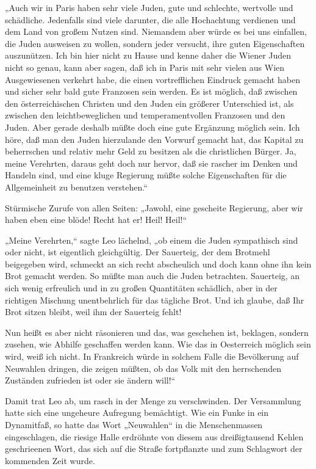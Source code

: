 „Auch wir in Paris haben sehr viele Juden, gute und schlechte,
wertvolle und schädliche. Jedenfalls sind viele darunter, die alle
Hochachtung verdienen und dem Land von großem Nutzen sind.
Niemandem aber würde es bei uns einfallen, die Juden ausweisen zu
wollen, sondern jeder versucht, ihre guten Eigenschaften
auszunützen. Ich bin hier nicht zu Hause und kenne daher die Wiener
Juden nicht so genau, kann aber sagen, daß ich in Paris mit sehr
vielen aus Wien Ausgewiesenen verkehrt habe, die einen
vortrefflichen Eindruck gemacht haben und sicher sehr bald gute
Franzosen sein werden. Es ist möglich, daß zwischen den
österreichischen Christen und den Juden ein größerer Unterschied
ist, als zwischen den leichtbeweglichen und temperamentvollen
Franzosen und den Juden. Aber gerade deshalb müßte doch eine gute
Ergänzung möglich sein.  Ich höre, daß man den
Juden hierzulande den Vorwurf gemacht hat, das Kapital zu
beherrschen und relativ mehr Geld zu besitzen als die christlichen
Bürger. Ja, meine Verehrten, daraus geht doch nur hervor, daß sie
rascher im Denken und Handeln sind, und eine kluge Regierung müßte
solche Eigenschaften für die Allgemeinheit zu benutzen verstehen.“

Stürmische Zurufe von allen Seiten: „Jawohl, eine gescheite
Regierung, aber wir haben eben eine blöde! Recht hat er! Heil!
Heil!“

„Meine Verehrten,“ sagte Leo lächelnd, „ob einem die Juden
sympathisch sind oder nicht, ist eigentlich gleichgültig. Der
Sauerteig, der dem Brotmehl beigegeben wird, schmeckt an sich recht
abscheulich und doch kann ohne ihn kein Brot gemacht werden. So
müßte man auch die Juden betrachten. Sauerteig, an sich wenig
erfreulich und in zu großen Quantitäten schädlich, aber in der
richtigen Mischung unentbehrlich für das tägliche Brot. Und ich
glaube, daß Ihr Brot sitzen bleibt, weil ihm der Sauerteig fehlt!

Nun heißt es aber nicht räsonieren und das, was geschehen ist,
beklagen, sondern zusehen, wie Abhilfe geschaffen werden kann. Wie
das in Oesterreich möglich sein wird, weiß ich nicht. In Frankreich
würde in solchem Falle die Bevölkerung auf Neuwahlen dringen, die
zeigen müßten, ob das Volk mit den herrschenden Zuständen zufrieden
ist oder sie ändern will!“

Damit trat Leo ab, um rasch in der Menge zu verschwinden. Der
Versammlung hatte sich eine ungeheure Aufregung bemächtigt. Wie ein
Funke in ein Dynamitfaß, so  hatte das Wort
„Neuwahlen“ in die Menschenmassen eingeschlagen, die riesige Halle
erdröhnte von diesem aus dreißigtausend Kehlen geschrieenen Wort,
das sich auf die Straße fortpflanzte und zum Schlagwort der
kommenden Zeit wurde.

